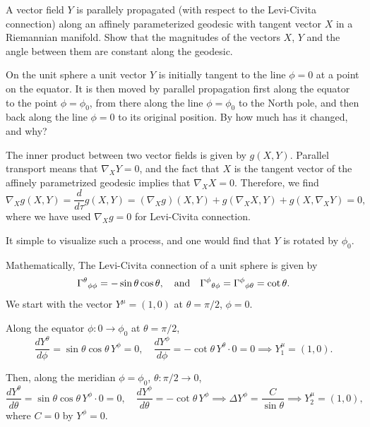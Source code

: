 A vector field $Y$ is parallely propagated (with respect to the Levi-Civita connection) along an affinely parameterized geodesic with tangent vector $X$ in a Riemannian manifold. Show that the magnitudes of the vectors $X$, $Y$ and the angle between them are constant along the geodesic.

On the unit sphere a unit vector $Y$ is initially tangent to the line $\phi=0$ at a point on the equator. It is then moved by parallel propagation first along the equator to the point $\phi=\phi_0$, from there along the line $\phi=\phi_0$ to the North pole, and then back along the line $\phi=0$ to its original position. By how much has it changed, and why?

\begin{solution}
    The inner product between two vector fields is given by $g(X,Y)$. Parallel transport means that $\nabla_X Y =0$, and the fact that $X$ is the tangent vector of the affinely parametrized geodesic implies that $\nabla_XX = 0$. Therefore, we find
    \begin{equation}
         \nabla_Xg(X,Y) =\frac{d}{d\tau} g(X,Y) =   (\nabla_Xg)(X,Y) + g(\nabla_XX,Y)+g(X,\nabla_XY) = 0,
    \end{equation}
    where we have used $\nabla_Xg = 0$ for Levi-Civita connection. 

    It simple to visualize such a process, and one would find that $Y$ is rotated by $\phi_0$. 
    
    Mathematically, The Levi-Civita connection of a unit sphere is given by
    \begin{equation}
        \Gamma^\theta{}_{\phi\phi} =  - \sin\theta \cos\theta, \quad {\rm and} \quad \Gamma^\phi{}_{\theta\phi} =  \Gamma^\phi{}_{\phi\theta} = \cot\theta.
    \end{equation}
    We start with the vector $Y^\mu = (1,0)$ at $\theta = \pi/2$, $\phi = 0$.

    Along the equator $\phi: 0\to\phi_0$ at $\theta = \pi/2$,
    \begin{equation}
        \frac{dY^\theta}{d\phi} = \sin\theta\cos\theta\, Y^\phi = 0, \quad
        \frac{dY^\phi}{d\phi} = -\cot\theta\, Y^\theta\cdot 0 = 0
        \implies Y_1^\mu = (1,0).
    \end{equation}

    Then, along the meridian $\phi = \phi_0$, $\theta: \pi/2\to 0$,
    \begin{equation}
        \frac{dY^\theta}{d\theta} = \sin\theta\cos\theta\, Y^\phi\cdot 0= 0, \quad
        \frac{dY^\phi}{d\theta} = -\cot\theta\, Y^\phi
        \implies \Delta Y^\phi = \frac{C}{\sin\theta}
        \implies Y_2^\mu = (1,0),
    \end{equation}
    where $C=0$ by $Y^\phi = 0$.


\end{solution}
